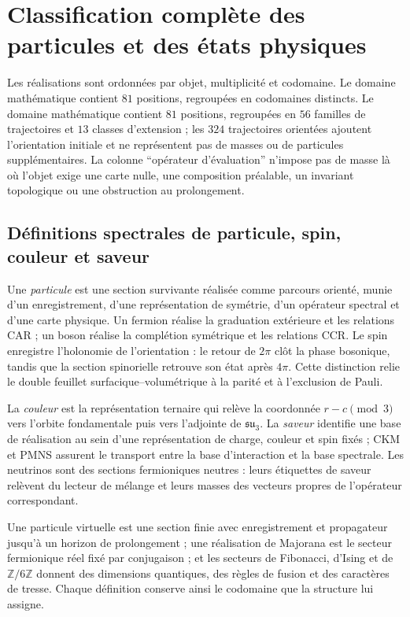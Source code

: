 \section{Classification complète des particules et des états physiques}
\label{sec:catalogo-realizaciones-tipadas-rev8}

Les réalisations sont ordonnées par objet, multiplicité et codomaine. Le domaine mathématique contient \(81\) positions, regroupées en
codomaines distincts. Le domaine mathématique contient \(81\) positions, regroupées en
\(56\) familles de trajectoires et \(13\) classes d'extension ; les \(324\)
trajectoires orientées ajoutent l'orientation initiale et ne représentent pas de masses
ou de particules supplémentaires. La colonne ``opérateur d'évaluation'' n'impose pas de masse là où l'objet exige
une carte nulle, une composition préalable, un invariant topologique ou une
obstruction au prolongement.

\subsection{Définitions spectrales de particule, spin, couleur et saveur}

Une \emph{particule} est une section survivante réalisée comme parcours
orienté, munie d'un enregistrement, d'une représentation de symétrie, d'un opérateur spectral
et d'une carte physique. Un fermion réalise la graduation extérieure et les relations
CAR ; un boson réalise la complétion symétrique et les relations CCR. Le
spin enregistre l'holonomie de l'orientation : le retour de \(2\pi\) clôt
la phase bosonique, tandis que la section spinorielle retrouve son état après
\(4\pi\). Cette distinction relie le double feuillet surfacique--volumétrique à la
parité et à l'exclusion de Pauli.

La \emph{couleur} est la représentation ternaire qui relève la coordonnée
\(r-c\pmod3\) vers l'orbite fondamentale puis vers l'adjointe de
\(\mathfrak{su}_3\). La \emph{saveur} identifie une base de réalisation
au sein d'une représentation de charge, couleur et spin fixés ; CKM et PMNS
assurent le transport entre la base d'interaction et la base spectrale. Les neutrinos
sont des sections fermioniques neutres : leurs étiquettes de saveur relèvent du
lecteur de mélange et leurs masses des vecteurs propres de l'opérateur correspondant.

Une particule virtuelle est une section finie avec enregistrement et propagateur jusqu'à
un horizon de prolongement ; une réalisation de Majorana est le secteur
fermionique réel fixé par conjugaison ; et les secteurs de Fibonacci, d'Ising et de
\(\mathbb Z/6\mathbb Z\) donnent des dimensions quantiques, des règles de fusion et
des caractères de tresse. Chaque définition conserve ainsi le codomaine que la
structure lui assigne.


